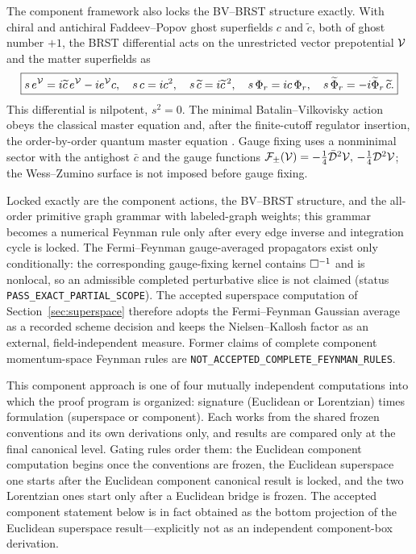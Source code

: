 The component framework also locks the BV--BRST structure exactly. With chiral
and antichiral Faddeev--Popov ghost superfields $c$ and $\widetilde c$, both of
ghost number $+1$, the BRST differential acts on the unrestricted vector
prepotential $\mathcal{V}$ and the matter superfields as
\begin{equation}\label{eq:05:brst}
\boxed{
s\,e^{\mathcal{V}}=i\widetilde c\,e^{\mathcal{V}}-i e^{\mathcal{V}}c,\quad
s\,c=ic^{2},\quad
s\,\widetilde c=i\widetilde c^{\,2},\quad
s\,\Phi_r=ic\,\Phi_r,\quad
s\,\widetilde\Phi_r=-i\widetilde\Phi_r\,\widetilde c.}
\end{equation}
This differential is nilpotent, $s^2=0$. The minimal Batalin--Vilkovisky action
obeys the classical master equation and, after the finite-cutoff regulator
insertion, the order-by-order quantum master equation \cite{BV}. Gauge fixing
uses a nonminimal sector with the antighost $\bar c$ and the gauge functions
$\mathcal F_\pm(\mathcal{V})=-\tfrac14\bar{\mathcal{D}}^{2}\mathcal{V},\,-\tfrac14\mathcal{D}^{2}\mathcal{V}$;
the Wess--Zumino surface is not imposed before gauge fixing.

\begin{remark}%
\label{rem:05:partialscope}
Locked exactly are the component actions, the BV--BRST structure, and the
all-order primitive graph grammar with labeled-graph weights; this grammar
becomes a numerical Feynman rule only after every edge inverse and integration
cycle is locked. The Fermi--Feynman gauge-averaged propagators exist only
conditionally: the corresponding gauge-fixing kernel contains $\Box^{-1}$ and
is nonlocal, so an admissible completed perturbative slice is not claimed
(status \texttt{PASS\_EXACT\_PARTIAL\_SCOPE}). The accepted superspace
computation of Section~\ref{sec:superspace} therefore adopts the
Fermi--Feynman Gaussian average as a recorded scheme decision and keeps the
Nielsen--Kallosh factor as an external, field-independent measure. Former
claims of complete component momentum-space Feynman rules are
\texttt{NOT\_ACCEPTED\_COMPLETE\_FEYNMAN\_RULES}.
\end{remark}

This component approach is one of four mutually independent computations into
which the proof program is organized: signature (Euclidean or Lorentzian) times
formulation (superspace or component). Each works from the shared frozen
conventions and its own derivations only, and results are compared only at the
final canonical level. Gating rules order them: the Euclidean component
computation begins once the conventions are frozen, the Euclidean superspace
one starts after the Euclidean component canonical result is locked, and the
two Lorentzian ones start only after a Euclidean bridge is frozen. The accepted
component statement below is in fact obtained as the bottom projection of the
Euclidean superspace result---explicitly not as an independent component-box
derivation.

